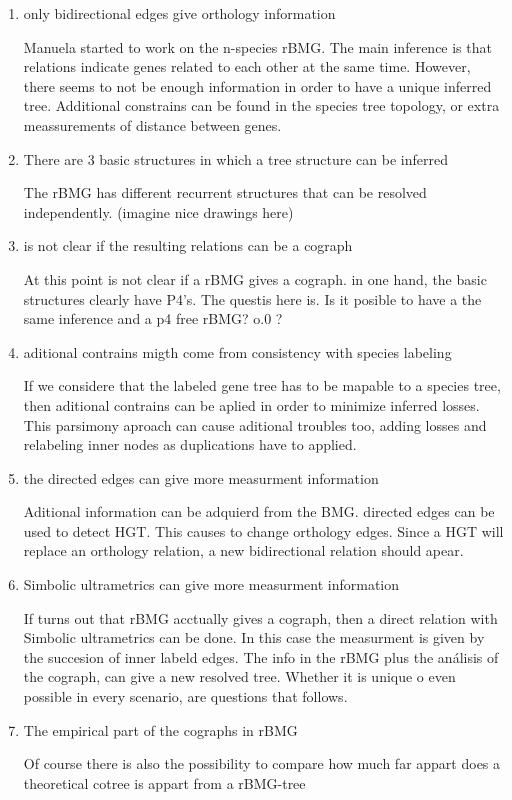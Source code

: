 \documentclass[11pt]{article}
\begin{document}
\begin{enumerate}
\item only bidirectional edges give orthology information

Manuela started to work on the n-species rBMG. The main inference is that relations indicate genes related to each other at the same time. However, there seems to not be enough information in order to have a unique inferred tree. Additional constrains can be found in the species tree topology, or extra meassurements of distance between genes.

\item There are 3 basic structures in which a tree structure can be inferred

The rBMG has different recurrent structures that can be resolved independently. (imagine nice drawings here)

\item is not clear if the resulting relations can be a cograph

At this point is not clear if a rBMG gives a cograph. in one hand, the basic structures clearly have P4's. The questis here is. Is it posible to have a the same inference and a p4 free rBMG? o.0 ?

\item aditional contrains migth come from consistency with species labeling

If we considere that the labeled gene tree has to be mapable to a species tree, then aditional contrains can be aplied in order to minimize inferred losses.
This parsimony aproach can cause aditional troubles too, adding losses and relabeling inner nodes as duplications have to applied.

\item the directed edges can give more measurment information

Aditional information can be adquierd from the BMG. directed edges can be used to detect HGT. This causes to change orthology edges. Since a HGT will replace an orthology relation, a new bidirectional relation should apear.

\item Simbolic ultrametrics can give more measurment information

If turns out that rBMG acctually gives a cograph, then a direct relation with Simbolic ultrametrics can be done.
In this case the measurment is given by the succesion of inner labeld edges.
The info in the rBMG plus the análisis of the cograph, can give a new resolved tree. Whether it is unique o even possible in every scenario, are questions that follows.

\item The empirical part of the cographs in rBMG 

Of course there is also the possibility to compare how much far appart does a theoretical cotree is appart from a rBMG-tree 


\end{enumerate}


% 
\end{document}
